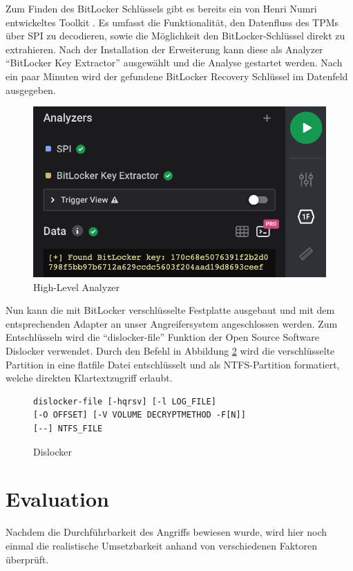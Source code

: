 \documentclass[conference]{IEEEtran}
\begin{document}
Zum Finden des BitLocker Schlüssels gibt es bereits ein von Henri Numri entwickeltes Toolkit \cite{GitHub.14122021}. Es umfasst die Funktionalität, den Datenfluss des TPMs über SPI zu decodieren, sowie die Möglichkeit den BitLocker-Schlüssel direkt zu extrahieren. Nach der Installation der Erweiterung kann diese als Analyzer ``BitLocker Key Extractor'' ausgewählt und die Analyse gestartet werden. Nach ein paar Minuten wird der gefundene BitLocker Recovery Schlüssel im Datenfeld ausgegeben.

\begin{figure}[h!]
	\centering
	\includegraphics[width=0.8\linewidth]{LogicPro}
	\caption{High-Level Analyzer \cite{GitHub.14122021}}
	\label{fig:LogikPro}
\end{figure}

Nun kann die mit BitLocker verschlüsselte Festplatte ausgebaut und mit dem entsprechenden Adapter an unser Angreifersystem angeschlossen werden. Zum Entschlüsseln wird die ``dislocker-file'' Funktion der Open Source Software Dislocker \cite{GitHub.14122021b} verwendet. Durch den Befehl in Abbildung \ref{fig:Dislocker} wird die verschlüsselte Partition in eine flatfile Datei entschlüsselt und als NTFS-Partition formatiert, welche direkten Klartextzugriff erlaubt.

\begin{figure}[h!]
	\begin{lstlisting}
dislocker-file [-hqrsv] [-l LOG_FILE] 
[-O OFFSET] [-V VOLUME DECRYPTMETHOD -F[N]] 
[--] NTFS_FILE
	\end{lstlisting}
	\caption{Dislocker}
	\label{fig:Dislocker}
\end{figure}

\section{Evaluation}
Nachdem die Durchführbarkeit des Angriffs bewiesen wurde, wird hier noch einmal die realistische Umsetzbarkeit anhand von verschiedenen Faktoren überprüft.
\end{document}
